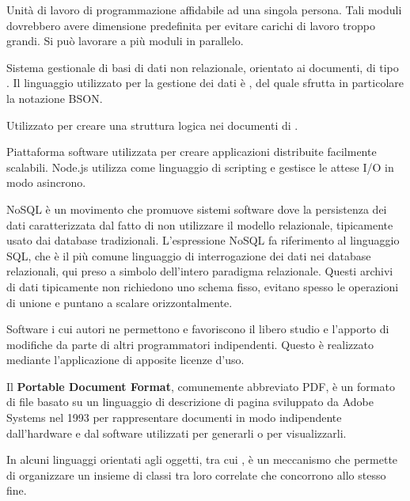 Unità di lavoro di programmazione affidabile ad una singola persona. Tali moduli dovrebbero avere dimensione predefinita per evitare carichi di lavoro troppo grandi. Si può lavorare a più moduli in parallelo.

Sistema gestionale di basi di dati non relazionale, orientato ai documenti, di tipo . Il linguaggio utilizzato per la gestione dei dati è , del quale sfrutta in particolare la notazione BSON.

Utilizzato per creare una struttura logica nei documenti di .


Piattaforma software utilizzata per creare applicazioni distribuite facilmente scalabili.
Node.js utilizza  come linguaggio di scripting e gestisce le attese I/O in modo asincrono.

NoSQL è un movimento che promuove sistemi software dove la persistenza dei dati caratterizzata dal fatto di non utilizzare il modello relazionale, tipicamente usato dai database tradizionali. L'espressione NoSQL fa riferimento al linguaggio SQL, che è il più comune linguaggio di interrogazione dei dati nei database relazionali, qui preso a simbolo dell'intero paradigma relazionale.
Questi archivi di dati tipicamente non richiedono uno schema fisso, evitano spesso le operazioni di unione e puntano a scalare orizzontalmente.


Software i cui autori ne permettono e favoriscono il libero studio e l'apporto di modifiche da parte di altri programmatori indipendenti. Questo è realizzato mediante l'applicazione di apposite licenze d'uso.


Il \textbf{Portable Document Format}, comunemente abbreviato PDF, è un formato di file basato su un linguaggio di descrizione di pagina sviluppato da Adobe Systems nel 1993 per rappresentare documenti in modo indipendente dall'hardware e dal software utilizzati per generarli o per visualizzarli. 

In alcuni linguaggi orientati agli oggetti, tra cui , è un meccanismo che permette di organizzare un insieme di classi tra loro correlate che concorrono allo stesso fine.

